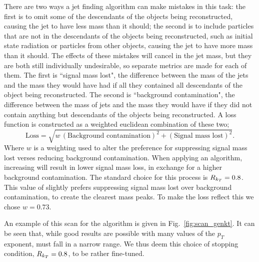 There are two ways a jet finding algorithm can make mistakes in this task:
the first is to omit some of the descendants of the objects being reconstructed, causing the jet to have less mass than it should;
the second is to include particles that are not in the descendants of the objects being reconstructed, such as initial state radiation or particles from other objects,
causing the jet to have more mass than it should.
The effects of these mistakes will cancel in the jet mass,
but they are both still individually undesirable,
so separate metrics are made for each of them.
The first is ``signal mass lost", the difference between the mass of the jets and the mass they would have had if all they contained all descendants of the object being reconstructed.
The second is ``background contamination", the difference between the mass of jets and the mass they would have if they did not contain anything but descendants of the objects being reconstructed.
A loss function is constructed as a weighted euclidean combination of these two;
\begin{equation}\label{eqn:loss}
\text{Loss} = \sqrt{w\,(\text{Background contamination})^2 + (\text{Signal mass lost})^2}.
\end{equation}
Where \(w\) is a weighting used to alter the preference for suppressing signal mass lost verses reducing background contamination.
When applying an \antikt{} algorithm, increasing \ktstoppingdeltar{} will result in lower signal mass loss, in exchange for a higher background contamination.
The standard choice for this process is \(R_{k_T}{}=0.8\).
This value of \ktstoppingdeltar{} slightly prefers suppressing signal mass lost over background contamination,
to create the clearest mass peaks.
To make the loss reflect this we chose \(w = 0.73\).

An example of this scan for the \genkt{} algorithm is given in Fig.~\ref{fig:scan_genkt}. 
It can be seen that, while good results are possible with many values of the \(p_T\) exponent,
                \ktstoppingdeltar{} must fall in a narrow range. We thus deem this choice of  stopping condition, \(R{}_{k_T}=0.8\), to be rather fine-tuned.

